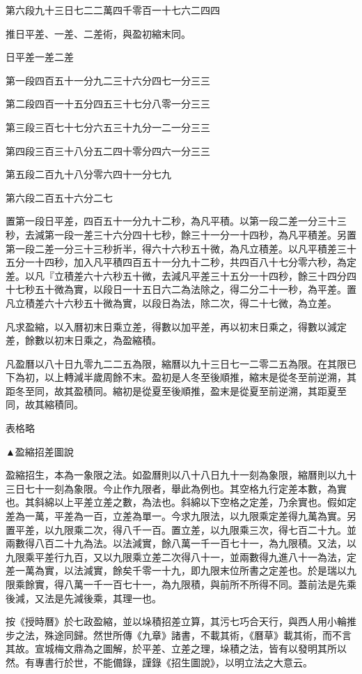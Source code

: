 第六段九十三日七二二萬四千零百一十七六二四四

推日平差、一差、二差術，與盈初縮末同。

日平差一差二差

第一段四百五十一分九二三十六分四七一分三三

第二段四百一十五分四五三十七分八零一分三三

第三段三百七十七分六五三十九分一二一分三三

第四段三百三十八分五二四十零分四六一分三三

第五段二百九十八分零六四十一分七九

第六段二百五十六分二七

置第一段日平差，四百五十一分九十二秒，為凡平積。以第一段二差一分三十三秒，去減第一段一差三十六分四十七秒，餘三十一分一十四秒，為凡平積差。另置第一段二差一分三十三秒折半，得六十六秒五十微，為凡立積差。以凡平積差三十五分一十四秒，加入凡平積四百五十一分九十二秒，共四百八十七分零六秒，為定差。以凡『立積差六十六秒五十微，去減凡平差三十五分一十四秒，餘三十四分四十七秒五十微為實，以段日一十五日六二為法除之，得二分二十一秒，為平差。置凡立積差六十六秒五十微為實，以段日為法，除二次，得二十七微，為立差。

凡求盈縮，以入曆初末日乘立差，得數以加平差，再以初末日乘之，得數以減定差，餘數以初末日乘之，為盈縮積。

凡盈曆以八十日九零九二二五為限，縮曆以九十三日七一二零二五為限。在其限已下為初，以上轉減半歲周餘不末。盈初是人冬至後順推，縮末是從冬至前逆溯，其距冬至同，故其盈積同。縮初是從夏至後順推，盈末是從夏至前逆溯，其距夏至同，故其縮積同。

表格略

▲盈縮招差圖說

盈縮招生，本為一象限之法。如盈曆則以八十八日九十一刻為象限，縮曆則以九十三日七十一刻為象限。今止作九限者，舉此為例也。其空格九行定差本數，為實也。其斜綿以上平差立差之數，為法也。斜綿以下空格之定差，乃余實也。假如定差為一萬，平差為一百，立差為單一。今求九限法，以九限乘定差得九萬為實。另置平差，以九限乘二次，得八千一百。置立差，以九限乘三次，得七百二十九。並兩數得八百二十九為法。以法減實，餘八萬一千一百七十一，為九限積。又法，以九限乘平差行九百，又以九限乘立差二次得八十一，並兩數得九進八十一為法，定差一萬為實，以法減實，餘矣千零一十九，即九限末位所書之定差也。於是瑞以九限乘餘實，得八萬一千一百七十一，為九限積，與前所不所得不同。蓋前法是先乘後減，又法是先減後乘，其理一也。

按《授時曆》於七政盈縮，並以垛積招差立算，其污七巧合天行，與西人用小輪推步之法，殊途同歸。然世所傳《九章》諸書，不載其術，《曆草》載其術，而不言其故。宣城梅文鼎為之圖解，於平差、立差之理，垛積之法，皆有以發明其所以然。有專書行於世，不能備錄，謹錄《招生圖說》，以明立法之大意云。

